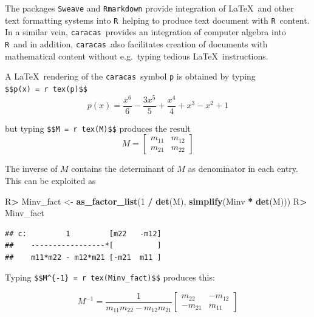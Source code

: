 \documentclass[10pt,]{article}
\newenvironment{Shaded}{\begin{snugshade}}{\end{snugshade}}
\newcommand{\DecValTok}[1]{\textcolor[rgb]{0.00,0.00,0.81}{#1}}
\newcommand{\KeywordTok}[1]{\textcolor[rgb]{0.13,0.29,0.53}{\textbf{#1}}}
\newcommand{\NormalTok}[1]{#1}
\newcommand{\OperatorTok}[1]{\textcolor[rgb]{0.81,0.36,0.00}{\textbf{#1}}}
\newcommand{\StringTok}[1]{\textcolor[rgb]{0.31,0.60,0.02}{#1}}
\begin{document}
The packages \texttt{Sweave} \citep{leisch:02} and \texttt{Rmarkdown}
\citep{rmarkdown} provide integration of \LaTeX~and other text
formatting systems into \texttt{R}\ helping to produce text document
with \texttt{R}\ content. In a similar vein, \texttt{caracas}~provides
an integration of computer algebra into \texttt{R}\ and in addition,
\texttt{caracas}~also facilitates creation of documents with
mathematical content without e.g.~typing tedious \LaTeX~instructions.

A \LaTeX~rendering of the \texttt{caracas}~symbol \texttt{p} is obtained
by typing
\texttt{\$\$p(x)\ =\ \textasciigrave{}r\ tex(p)\textasciigrave{}\$\$} \[
p(x) = \frac{x^{6}}{6} - \frac{3 x^{5}}{5} + \frac{x^{4}}{4} + x^{3} - x^{2} + 1
\]

but typing
\texttt{\$\$M\ =\ \textasciigrave{}r\ tex(M)\textasciigrave{}\$\$}
produces the result \[
M = \left[\begin{matrix}m_{11} & m_{12}\\m_{21} & m_{22}\end{matrix}\right]
\]

The inverse of \(M\) contains the determinant of \(M\) as denominator in
each entry. This can be exploited as

\begin{Shaded}
\begin{Highlighting}[]
\NormalTok{R}\OperatorTok{>}\StringTok{ }\NormalTok{Minv_fact <-}\StringTok{ }\KeywordTok{as_factor_list}\NormalTok{(}\DecValTok{1} \OperatorTok{/}\StringTok{ }\KeywordTok{det}\NormalTok{(M), }\KeywordTok{simplify}\NormalTok{(Minv }\OperatorTok{*}\StringTok{ }\KeywordTok{det}\NormalTok{(M)))}
\NormalTok{R}\OperatorTok{>}\StringTok{ }\NormalTok{Minv_fact}
\end{Highlighting}
\end{Shaded}

\begin{verbatim}
## c:         1         [m22   -m12]
##    -----------------*[          ]
##    m11*m22 - m12*m21 [-m21  m11 ]
\end{verbatim}

Typing
\texttt{\$\$M\^{}\{-1\}\ =\ \textasciigrave{}r\ tex(Minv\_fact)\textasciigrave{}\$\$}
produces this:

\[
M^{-1}= \frac{1}{m_{11} m_{22} - m_{12} m_{21}}  \left[\begin{matrix}m_{22} & - m_{12}\\- m_{21} & m_{11}\end{matrix}\right]
\]
\end{document}
